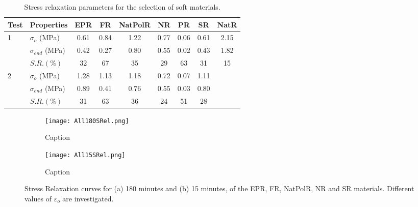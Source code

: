 \begin{table*}[htb!]
\centering
\caption{Stress relaxation parameters for the selection of soft materials.}
\label{tbl:stressRelProperties}
\begin{tabular}{llccccccc} \toprule
Test & Properties & EPR & FR & NatPolR & NR & PR & SR & NatR \\
\hline
\multirow{3}{*}{1}  & $\sigma_o$ (MPa)   & 0.61      & 0.84      & 1.22      & 0.77      & 0.06      & 0.61      & 2.15 \\
                & $\sigma_{end}$ (MPa)    & 0.42      & 0.27      & 0.80      & 0.55      & 0.02      & 0.43      & 1.82 \\
                & $S.R. (\%)$    &  32     & 67      & 35      & 29      & 63      & 31      & 15 \\
                     
\hline 
\multirow{3}{*}{2}  & $\sigma_o$ (MPa)     & 1.28      & 1.13      & 1.18      & 0.72      & 0.07      & 1.11  &         \\
                & $\sigma_{end}$ (MPa)     & 0.89      & 0.41      & 0.76      & 0.55      & 0.03      & 0.80  &          \\
                & $S.R. (\%)$     & 31      & 63      & 36      & 24      & 51      & 28  &          \\
\bottomrule
\end{tabular}
\end{table*}


\begin{figure}[H]
    \vspace*{-2em}
    \centering
        \begin{subfigure}[b]{0.95\textwidth}
        \centering
        \texttt{[image: All180SRel.png]}
        \caption{Caption}
        \label{sfig:ALL180SRel}
    \end{subfigure}
    \begin{subfigure}[b]{0.95\textwidth}
        \centering
        \texttt{[image: All15SRel.png]}
        \caption{Caption}
        \label{sfig:centering}
    \end{subfigure}
    \caption{Stress Relaxation curves for (a) 180 minutes and (b) 15 minutes, of the EPR, FR, NatPolR, NR and SR materials. Different values of $\varepsilon_o$ are investigated.}
    \label{fig:AllSRel}
\end{figure}

